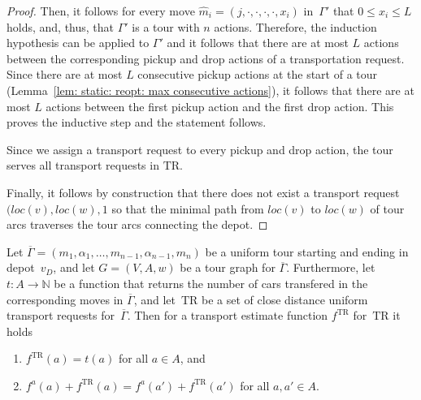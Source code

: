 \documentclass[english]{llncs}
\numberwithin{sublemma}{lemma}
\newcommand{\aloc}{\ensuremath{loc}}
\newcommand{\ntourd}{\ensuremath{n}}
\newcommand{\NN}{\ensuremath{\mathbb{N}}}
\newcommand{\capd}{\ensuremath{L}}
\newcommand{\tourd}{\ensuremath{\Gamma}}
\newcommand{\action}{\ensuremath{\alpha}}
\newcommand{\move}{\ensuremath{m}}
\newcommand{\TR}{\mathrm{TR}}
\begin{document}
\begin{proof}
Then, it follows for every move $\hat{\move}_i = (j, \cdot, \cdot, \cdot, \cdot, x_i)$ in~$\tourd'$ that $0 \leq x_i \leq \capd$ holds,
and, thus, that $\tourd'$ is a tour with $\ntourd$ actions.
Therefore, the induction hypothesis can be applied to $\tourd'$ and it follows that there are at most $\capd$ actions between the corresponding pickup and drop actions of a transportation request.
Since there are at most $\capd$ consecutive pickup actions at the start of a tour (Lemma~\ref{lem: static: reopt: max consecutive actions}), it follows that there are at most $\capd$ actions between the first pickup action and the first drop action.
This proves the inductive step and the statement follows.


Since we assign a transport request to every pickup and drop action, the tour serves all transport requests in $\TR$.


Finally, it follows by construction that there does not exist a transport request $(\aloc(v), \aloc(w), 1$ so that the minimal path from $\aloc(v)$ to $\aloc(w)$ of tour arcs traverses the tour arcs connecting the depot.
\end{proof}





\begin{lemma}
\label{cor: static: reopt: existence tour}
  Let $\overline{\tourd} = (\move_1, \action_1, \dotsc, \move_{\ntourd - 1}, \action_{\ntourd - 1}, \move_{\ntourd})$ be a uniform tour starting and ending in depot~$v_D$,
  and let $G = (V, A, w)$ be a tour graph for $\overline{\tourd}$.
  Furthermore, let $t : A \to \NN$ be a function that returns the number of cars transfered in the corresponding moves in $\overline{\tourd}$,
and let~$\TR$ be a set of close distance uniform transport requests for~$\overline{\tourd}$.
  Then for a transport estimate function $f^{\TR}$ for~$\TR$ it holds
  \begin{enumerate}
   \item \label{cor: static: reopt: existence tour: 1} $f^{\TR}(a) = t(a)$ for all $a \in A$, and
   \item \label{cor: static: reopt: existence tour: 2} $f^{a}(a) + f^{\TR}(a) = f^{a}(a') + f^{\TR}(a')$ for all $a, a' \in A$.
  \end{enumerate}
\end{lemma}
\end{document}
